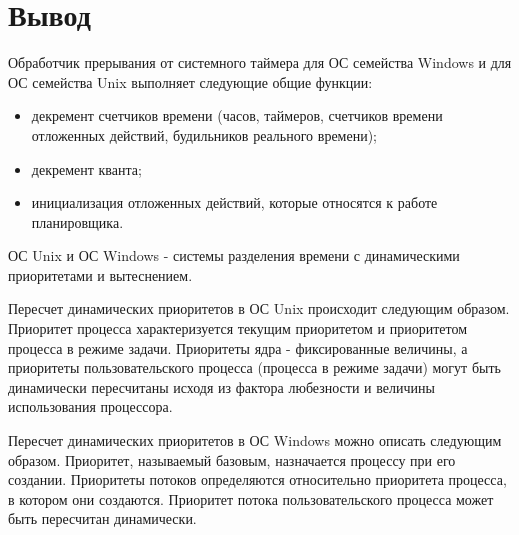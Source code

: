 \chapter*{Вывод}

Обработчик прерывания от системного таймера для ОС семейства Windows и для ОС семейства Unix выполняет следующие общие функции:
\begin{itemize}
	\item декремент счетчиков времени (часов, таймеров, счетчиков времени отложенных действий, будильников реального времени);
	\item декремент кванта;
	\item инициализация отложенных действий, которые относятся к работе планировщика.
\end{itemize}

ОС Unix и ОС Windows - системы разделения времени с динамическими приоритетами и вытеснением.

Пересчет динамических приоритетов в ОС Unix происходит следующим образом. Приоритет процесса характеризуется текущим  приоритетом и приоритетом процесса в режиме задачи. Приоритеты ядра - фиксированные величины, а приоритеты пользовательского процесса (процесса в режиме задачи) могут быть динамически пересчитаны исходя из фактора любезности и величины использования процессора.

Пересчет динамических приоритетов в ОС Windows можно описать следующим образом. Приоритет, называемый базовым, назначается процессу при его создании. Приоритеты потоков определяются относительно приоритета процесса, в котором они создаются. Приоритет потока пользовательского процесса может быть пересчитан динамически.